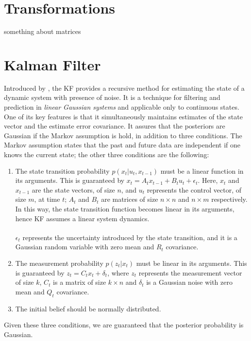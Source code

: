\section{Transformations}
\label{sec:chapter1:transform}
something about matrices

\section{Kalman Filter}
\label{sec:chapter1:kf}
\nocite{intro-robotics}

Introduced by \cite{kalman}, the \ac{KF} provides a recursive method for estimating the state of a dynamic system with presence of noise. It is a technique for filtering and prediction in \emph{linear Gaussian systems} and applicable only to continuous states. One of its key features is that it simultaneously maintains estimates of the state vector and the estimate error covariance. It assures that the posteriors are Gaussian if the Markov assumption is hold, in addition to three conditions. The Markov assumption states that the past and future data are independent if one knows the current state; the other three conditions are the following:
\begin{enumerate}
    \item{The state transition probability $p\left( x_t | u_t, x_{t-1}\right)$ must be a linear function in its arguments. This is guaranteed by $ x_t = A_t x_{t-1} + B_t u_t + \epsilon_t $. Here, $x_t$ and $x_{t-1}$ are the state vectors, of size $n$, and $u_t$ represents the control vector, of size $m$, at time $t$; $A_t$ and $B_t$ are matrices of size $n \times n$ and $n\times m$ respectively. In this way, the state transition function becomes linear in its arguments, hence KF assumes a linear system dynamics. \\\\ $\epsilon_t$ represents the uncertainty introduced by the state transition, and it is a Gaussian random variable with zero mean and $R_t$ covariance.}
    \item{The measurement probability $p\left(z_t | x_t\right)$ must be linear in its arguments. This is guaranteed by $z_t = C_t x_t + \delta_t$, where $z_t$ represents the measurement vector of size $k$, $C_t$ is a matrix of size $k \times n$ and $\delta_t$ is a Gaussian noise with zero mean and $Q_t$ covariance.}
    \item{The initial belief should be normally distributed.}
\end{enumerate}
Given these three conditions, we are guaranteed that the posterior probability is Gaussian.

